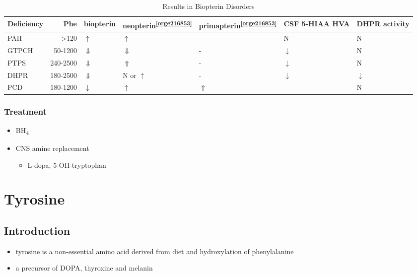 \documentclass[12pt]{scrartcl}
\begin{document}
\begin{table}[htbp]
\caption{\label{tab:org0562f96}Results in Biopterin Disorders}
\centering
\begin{tabular}{lrlllll}
Deficiency & Phe & biopterin\footnotemark & neopterin\textsuperscript{\ref{orge216853}} & primapterin\textsuperscript{\ref{orge216853}} & CSF 5-HIAA HVA & DHPR activity\\
\hline
PAH & \textgreater{}120 & \(\uparrow\) & \(\uparrow\) & - & N & N\\
GTPCH & 50-1200 & \(\Downarrow\) & \(\Downarrow\) & - & \(\downarrow\) & N\\
PTPS & 240-2500 & \(\Downarrow\) & \(\Uparrow\) & - & \(\downarrow\) & N\\
DHPR & 180-2500 & \(\Downarrow\) & N or \(\uparrow\) & - & \(\downarrow\) & \(\downarrow\)\\
PCD & 180-1200 & \(\downarrow\) & \(\uparrow\) & \(\Uparrow\) &  & N\\
\end{tabular}
\end{table}

\subsubsection{Treatment}
\label{sec:org3aa22bb}
\begin{itemize}
\item BH\textsubscript{4}
\item CNS amine replacement
\begin{itemize}
\item L-dopa, 5-OH-tryptophan
\end{itemize}
\end{itemize}

\section{Tyrosine}
\label{sec:orgf5b4af5}
\subsection{Introduction}
\label{sec:org6eecfc9}
\begin{itemize}
\item tyrosine is a non-essential amino acid derived from diet and hydroxylation of phenylalanine
\item a precursor of DOPA, thyroxine and melanin
\end{itemize}
\end{document}
